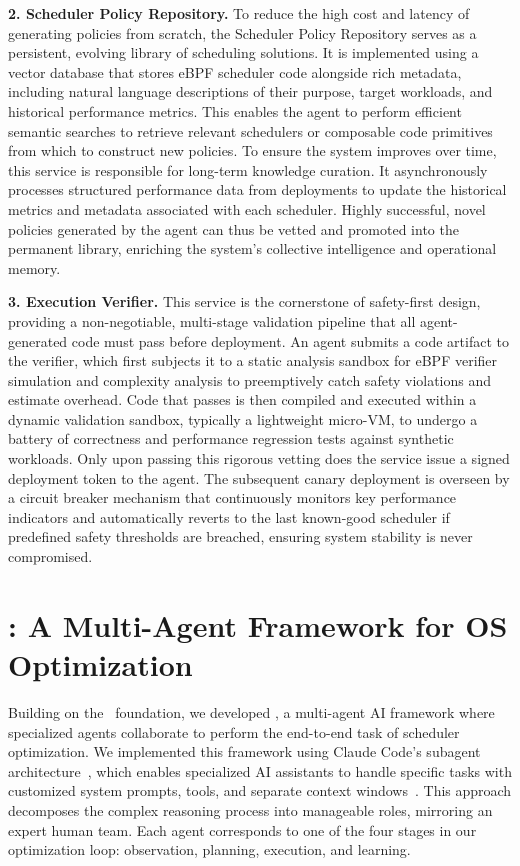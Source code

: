 \textbf{2. Scheduler Policy Repository.} To reduce the high cost and latency of generating policies from scratch, the Scheduler Policy Repository serves as a persistent, evolving library of scheduling solutions. It is implemented using a vector database that stores eBPF scheduler code alongside rich metadata, including natural language descriptions of their purpose, target workloads, and historical performance metrics. This enables the agent to perform efficient semantic searches to retrieve relevant schedulers or composable code primitives from which to construct new policies. To ensure the system improves over time, this service is responsible for long-term knowledge curation. It asynchronously processes structured performance data from deployments to update the historical metrics and metadata associated with each scheduler. Highly successful, novel policies generated by the agent can thus be vetted and promoted into the permanent library, enriching the system's collective intelligence and operational memory.

\textbf{3. Execution Verifier.} This service is the cornerstone of \sys safety-first design, providing a non-negotiable, multi-stage validation pipeline that all agent-generated code must pass before deployment. An agent submits a code artifact to the verifier, which first subjects it to a static analysis sandbox for eBPF verifier simulation and complexity analysis to preemptively catch safety violations and estimate overhead. Code that passes is then compiled and executed within a dynamic validation sandbox, typically a lightweight micro-VM, to undergo a battery of correctness and performance regression tests against synthetic workloads. Only upon passing this rigorous vetting does the service issue a signed deployment token to the agent. The subsequent canary deployment is overseen by a circuit breaker mechanism that continuously monitors key performance indicators and automatically reverts to the last known-good scheduler if predefined safety thresholds are breached, ensuring system stability is never compromised.

\section{\agent: A Multi-Agent Framework for OS Optimization}
\label{sec:sched_agents}

Building on the \sys\ foundation, we developed \textbf{\agent}, a multi-agent AI framework where specialized agents collaborate to perform the end-to-end task of scheduler optimization. We implemented this framework using Claude Code's subagent architecture~\cite{anthropic2024subagents}, which enables specialized AI assistants to handle specific tasks with customized system prompts, tools, and separate context windows~\cite{anthropic2024multiagent}. This approach decomposes the complex reasoning process into manageable roles, mirroring an expert human team. Each agent corresponds to one of the four stages in our optimization loop: observation, planning, execution, and learning.

